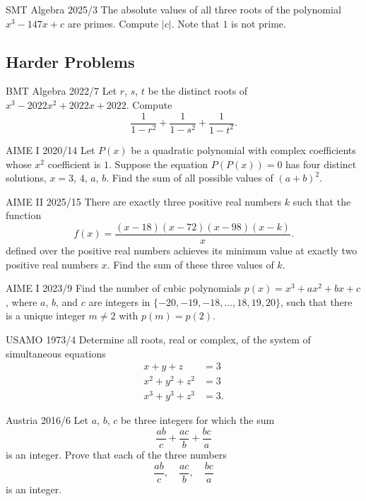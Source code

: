 \documentclass[11pt]{scrartcl}
\begin{document}
\begin{problem}[18]{SMT Algebra 2025/3}
The absolute values of all three roots of the polynomial $x^3-147x+c$ are primes. Compute $|c|$. Note that $1$ is not prime.
\end{problem}

\subsection{Harder Problems}

\begin{problem}[1]{BMT Algebra 2022/7}
Let $r$, $s$, $t$ be the distinct roots of $x^3-2022x^2+2022x+2022$. Compute \[\dfrac{1}{1-r^2}+\dfrac{1}{1-s^2}+\dfrac{1}{1-t^2}.\]
\end{problem}

\begin{problem}[2]{AIME I 2020/14}
Let $P(x)$ be a quadratic polynomial with complex coefficients whose $x^2$ coefficient is $1$. Suppose the equation $P(P(x))=0$ has four distinct solutions, $x=3$, $4$, $a$, $b$. Find the sum of all possible values of $(a+b)^2$.
\end{problem}

\begin{problem}[3]{AIME II 2025/15}
There are exactly three positive real numbers $k$ such that the function\[f(x)=\frac{(x-18)(x-72)(x-98)(x-k)}{x}.\]defined over the positive real numbers achieves its minimum value at exactly two positive real numbers $x$. Find the sum of these three values of $k$.
\end{problem}

\begin{problem}[4]{AIME I 2023/9}
Find the number of cubic polynomials $p(x) = x^3 + ax^2 + bx + c$, where $a$, $b$, and $c$ are integers in $\{-20,-19,-18,\ldots,18,19,20\}$, such that there is a unique integer $m \neq 2$ with $p(m) = p(2)$.
\end{problem}

\begin{problem}[5]{USAMO 1973/4}
Determine all roots, real or complex, of the system of simultaneous equations
\begin{align*}
x+y+z &= 3 \\
x^2+y^2+z^2 &= 3 \\
x^3+y^3+z^3 &= 3.
\end{align*}
\end{problem}

\begin{problem}[6]{Austria 2016/6}
Let $a$, $b$, $c$ be three integers for which the sum \[\frac{ab}{c}+ \frac{ac}{b}+ \frac{bc}{a}\] is an integer. Prove that each of the three numbers \[\frac{ab}{c}, \quad \frac{ac}{b},\quad \frac{bc}{a}\] is an integer.
\end{problem}
\end{document}
